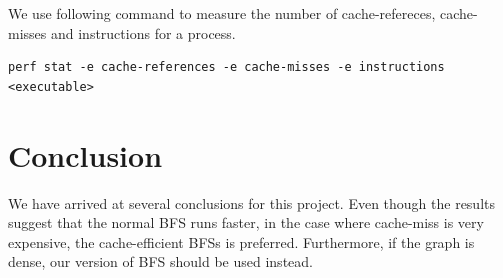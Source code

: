 \documentclass[12pt]{article}
\begin{document}
We use following command to measure the number of cache-refereces, cache-misses and instructions for a process.

\begin{verbatim}
perf stat -e cache-references -e cache-misses -e instructions <executable>
\end{verbatim}

\pagebreak

\section{Conclusion}

We have arrived at several conclusions for this project. Even though the results suggest that the normal BFS runs faster, in the case where cache-miss is very expensive, the cache-efficient BFSs is preferred. Furthermore, if the graph is dense, our version of BFS should be used instead.
\end{document}
